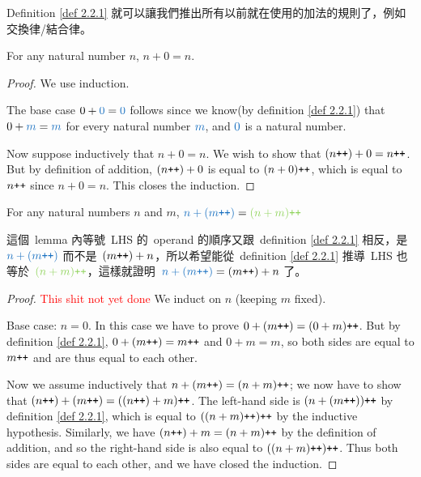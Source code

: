 \begin{note}
Definition \ref{def 2.2.1} 就可以讓我們推出所有以前就在使用的加法的規則了，例如交換律/結合律。
\end{note}

\begin{lemma}\label{lem 2.2.2}
For any natural number \(n\), \(n + 0 = n\).
\begin{proof} We use induction.

The base case \(0 + \BLUE{0} = \BLUE{0}\) follows since we know(by definition \ref{def 2.2.1}) that \(0 + \BLUE{m} = \BLUE{m}\) for every natural number \(\BLUE{m}\), and \(\BLUE{0}\) is a natural number.

Now suppose inductively that \(n + 0 = n\). We wish to show that \((n\texttt{++})+0 = n\texttt{++}\). But by definition of addition, \((n\texttt{++}) + 0\) is equal to \((n + 0)\texttt{++}\), which is equal to \(n\texttt{++}\) since \(n + 0 = n\). This closes the induction.
\end{proof}
\end{lemma}

\begin{lemma}\label{lem 2.2.3} For any natural numbers \(n\) and \(m\), \(\BLUE{n + (m\INC)} = \GREEN{(n + m)\INC}\)
\begin{note}
這個\ lemma 內等號\ LHS 的\ operand 的順序又跟\ definition \ref{def 2.2.1} 相反，是\ \(\BLUE{n + (m\INC)}\) 而不是\  \((m\texttt{++}) + n\)，所以希望能從\ definition \ref{def 2.2.1} 推導\  LHS 也等於\ \(\GREEN{(n + m)\INC}\)，這樣就證明\ \(\BLUE{n + (m\INC)} = (m\INC) + n\) 了。
\end{note}
\begin{proof}
\textcolor{red}{This shit not yet done}
We induct on \(n\) (keeping \(m\) fixed).

Base case: \(n = 0\). In this case we have to prove \(0 + (m\texttt{++}) = (0 + m)\texttt{++}\). But by definition \ref{def 2.2.1}, \(0 + (m\texttt{++}) = m\texttt{++}\) and \(0 + m = m\), so both sides are equal to \(m\texttt{++}\) and are thus equal to each other.

Now we assume inductively that \(n + (m\texttt{++}) = (n + m)\texttt{++}\); we now have to show that \((n\texttt{++}) + (m\texttt{++}) = ((n\texttt{++}) + m)\texttt{++}\). The left-hand side is \((n + (m\texttt{++}))\texttt{++}\) by definition \ref{def 2.2.1}, which is equal to \(((n + m)\texttt{++})\texttt{++}\) by the inductive hypothesis. Similarly, we have \((n\texttt{++}) + m =(n + m)\texttt{++}\) by the definition of addition, and so the right-hand side is also equal to \(((n + m)\texttt{++})\texttt{++}\). Thus both sides are equal to each other, and we have closed the induction.
\end{proof}
\end{lemma}